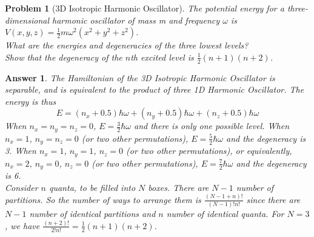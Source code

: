 \documentclass[a4paper]{article}
\newtheorem{ans}{Answer}[section]
\theoremstyle{new}
\newtheorem{qns}{Problem}[section]
\begin{document}
\newpage
\begin{qns}[3D Isotropic Harmonic Oscillator]
The potential energy for a three-dimensional harmonic oscillator of mass m and frequency $\omega$ is $V(x,y,z)=\frac{1}{2}m\omega^2(x^2+y^2+z^2)$.\\[5pt]
What are the energies and degeneracies of the three lowest levels?\\[5pt]
Show that the degeneracy of the $n$th excited level is $\frac{1}{2}(n+1)(n+2)$.
\end{qns}
\begin{ans}
The Hamiltonian of the 3D Isotropic Harmonic Oscillator is separable, and is equivalent to the product of three 1D Harmonic Oscillator. The energy is thus 
$$E=(n_x+0.5)\hbar\omega+(n_y+0.5)\hbar\omega+(n_z+0.5)\hbar\omega$$
When $n_x=n_y=n_z=0$, $E=\frac{3}{2}\hbar\omega$ and there is only one possible level. When $n_x=1$, $n_y=n_z=0$ (or two other permutations), $E=\frac{5}{2}\hbar\omega$ and the degeneracy is 3. When $n_x=1$, $n_y=1$, $n_z=0$ (or two other permutations), or equivalently, $n_x=2$, $n_y=0$, $n_z=0$ (or two other permutations), $E=\frac{7}{2}\hbar\omega$ and the degeneracy is 6.\\[5pt]
Consider $n$ quanta, to be filled into $N$ boxes. There are $N-1$ number of partitions. So the number of ways to arrange them is $\frac{(N-1+n)!}{(N-1)!n!}$ since there are $N-1$ number of identical partitions and $n$ number of identical quanta. For $N=3$, we have $\frac{(n+2)!}{2!n!}=\frac{1}{2}(n+1)(n+2)$. 
\end{ans}
\end{document}
